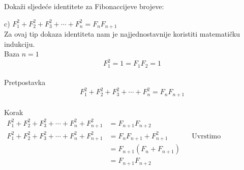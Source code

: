 \documentclass{article}
\begin{document}
	Dokaži sljedeće identitete za Fibonaccijeve brojeve:
	
	c) \( F^2_1 + F^2_2 + F^2_3 + \cdots + F^2_n = F_n F_{n + 1} \) \\
	
	Za ovaj tip dokaza identiteta nam je najjednostavnije koristiti matematičku indukciju. \\
	
	Baza \(n = 1\)
	\[ F^2_1 = 1 = F_1 F_2 = 1 \] \\
	
	Pretpostavka
	\[ F^2_1 + F^2_2 + F^2_3 + \cdots + F^2_n = F_n F_{n + 1} \] \\
	
	Korak
	\begin{align*}
		F^2_1 + F^2_2 + F^2_3 + \cdots + F^2_n + F^2_{n + 1} &= F_{n + 1} F_{n + 2} \\
		F^2_1 + F^2_2 + F^2_3 + \cdots + F^2_n + F^2_{n + 1} &= F_n F_{n + 1} + F^2_{n + 1} && \text{Uvrstimo pretpostavku} \\
		&= F_{n + 1} (F_n + F_{n + 1}) \\
		&= F_{n + 1} F_{n + 2}
	\end{align*}
\end{document}
